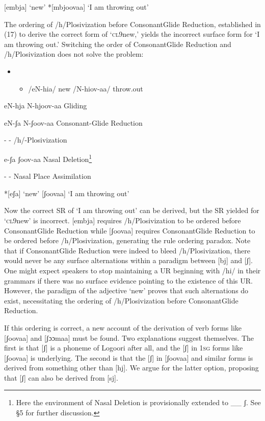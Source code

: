 \documentclass[output=paper]{langsci/langscibook}
\begin{document}
[embja]  ‘new’    *[mbjoovaa]  ‘I am throwing out’

The ordering of /h/Plosivization before ConsonantGlide Reduction, established in (17) to derive the correct form of ‘\textsc{cl}9new,’ yields the incorrect surface form for ‘\textsc{I} am throwing out.’ Switching the order of ConsonantGlide Reduction and /h/Plosivization does not solve the problem:

\begin{itemize}
\item \setcounter{itemize}{0}
\begin{itemize}
\item /eN-hia/  new  /N-hiov-aa/  throw.out

\end{itemize}
\end{itemize}

eN-hja      N-hjoov-aa        Gliding

eN-ʃa        N-ʃoov-aa        Consonant-Glide Reduction

{}-        {}-          /h/-Plosivization

e-ʃa        ʃoov-aa        Nasal Deletion\footnote{ Here the environment of Nasal Deletion is provisionally extended to \_\_ ʃ. See §5 for further discussion.}

{}-        {}-          Nasal Place Assimilation

*[eʃa]    ‘new’    [ʃoovaa]  ‘I am throwing out’

Now the correct SR of ‘I am throwing out’ can be derived, but the SR yielded for ‘\textsc{cl}9new’ is incorrect. [embja] requires /h/Plosivization to be ordered before ConsonantGlide Reduction while [ʃoovaa] requires ConsonantGlide Reduction to be ordered before /h/Plosivization, generating the rule ordering paradox. Note that if ConsonantGlide Reduction were indeed to bleed /h/Plosivization, there would never be any surface alternations within a paradigm between [bj] and [ʃ]. One might expect speakers to stop maintaining a UR beginning with /hi/ in their grammars if there was no surface evidence pointing to the existence of this UR. However, the paradigm of the adjective ‘new’ proves that such alternations do exist, necessitating the ordering of /h/Plosivization before ConsonantGlide Reduction. 

If this ordering is correct, a new account of the derivation of verb forms like [ʃoovaa] and [ʃɔɔmaa] must be found. Two explanations suggest themselves. The first is that [ʃ] is a phoneme of Logoori after all, and the [ʃ] in 1\textsc{sg} forms like [ʃoovaa] is underlying. The second is that the [ʃ] in [ʃoovaa] and similar forms is derived from something other than [hj]. We argue for the latter option, proposing that [ʃ] can also be derived from [sj].
\end{document}

